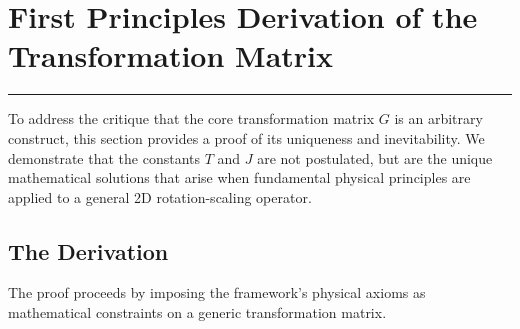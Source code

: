 







\section{First Principles Derivation of the Transformation Matrix}
\label{sec:fortify_g_matrix}
\hrule
\vspace{1em}
To address the critique that the core transformation matrix $G$ is an arbitrary construct, this section provides a proof of its uniqueness and inevitability. We demonstrate that the constants $T$ and $J$ are not postulated, but are the unique mathematical solutions that arise when fundamental physical principles are applied to a general 2D rotation-scaling operator.

\subsection*{The Derivation}
The proof proceeds by imposing the framework's physical axioms as mathematical constraints on a generic transformation matrix.

